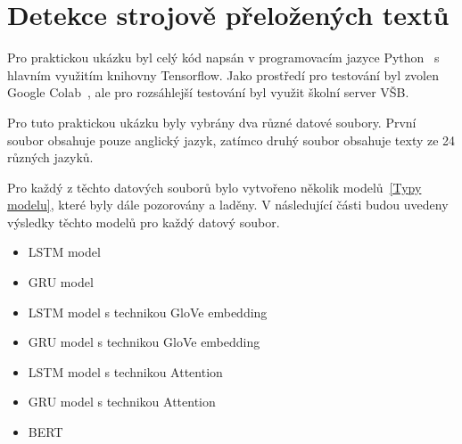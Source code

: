 \chapter{Detekce strojově přeložených textů}
Pro praktickou ukázku byl celý kód napsán v programovacím jazyce Python~\cite{link38} s hlavním využitím knihovny Tensorflow.
Jako prostředí pro testování byl zvolen Google Colab~\cite{link33}, ale pro rozsáhlejší testování byl využit školní server VŠB.

Pro tuto praktickou ukázku byly vybrány dva různé datové soubory.
První soubor obsahuje pouze anglický jazyk, zatímco druhý soubor obsahuje texty ze 24 různých jazyků.

Pro každý z těchto datových souborů bylo vytvořeno několik modelů~\ref{Typy modelu}, které byly dále pozorovány a laděny.
V následující části budou uvedeny výsledky těchto modelů pro každý datový soubor.

\begin{itemize}\label{Typy modelu}
    \item LSTM model
    \item GRU model
    \item LSTM model s technikou GloVe embedding
    \item GRU model s technikou GloVe embedding 
    \item LSTM model s technikou Attention
    \item GRU model s technikou Attention
    \item BERT
\end{itemize} 

